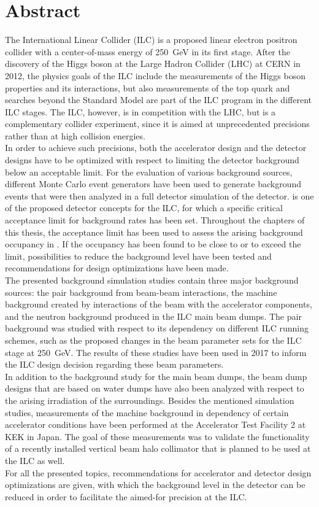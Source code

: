 \chapter*{Abstract}
The International Linear Collider (ILC) is a proposed linear electron positron collider with a center-of-mass energy of \SI{250}{\GeV} in its first stage.
After the discovery of the Higgs boson at the Large Hadron Collider (LHC) at CERN in 2012, the physics goals of the ILC include the measurements of the Higgs boson properties and its interactions, but also measurements of the top quark and searches beyond the Standard Model are part of the ILC program in the different ILC stages.
The ILC, however, is in competition with the LHC, but is a complementary collider experiment, since it is aimed at unprecedented precisions rather than at high collision energies.
\\In order to achieve such precisions, both the accelerator design and the detector designs have to be optimized with respect to limiting the detector background below an acceptable limit.
For the evaluation of various background sources, different Monte Carlo event generators have been used to generate background events that were then analyzed in a full detector simulation of the \sid detector.
\sid is one of the proposed detector concepts for the ILC, for which a specific critical acceptance limit for background rates has been set.
Throughout the chapters of this thesis, the acceptance limit has been used to assess the arising background occupancy in \sid.
If the occupancy has been found to be close to or to exceed the limit, possibilities to reduce the background level have been tested and recommendations for design optimizations have been made.
\\The presented background simulation studies contain three major background sources: the \positron\electron pair background from beam-beam interactions, the machine background created by interactions of the beam with the accelerator components, and the neutron background produced in the ILC main beam dumps.
The pair background was studied with respect to its dependency on different ILC running schemes, such as the proposed changes in the beam parameter sets for the ILC stage at \SI{250}{\GeV}.
The results of these studies have been used in 2017 to inform the ILC design decision regarding these beam parameters.
\\In addition to the background study for the main beam dumps, the beam dump designs that are based on water dumps have also been analyzed with respect to the arising irradiation of the surroundings.
Besides the mentioned simulation studies, measurements of the machine background in dependency of certain accelerator conditions have been performed at the Accelerator Test Facility 2 at KEK in Japan.
The goal of these measurements was to validate the functionality of a recently installed vertical beam halo collimator that is planned to be used at the ILC as well.
\\For all the presented topics, recommendations for accelerator and detector design optimizations are given, with which the background level in the \sid detector can be reduced in order to facilitate the aimed-for precision at the ILC.